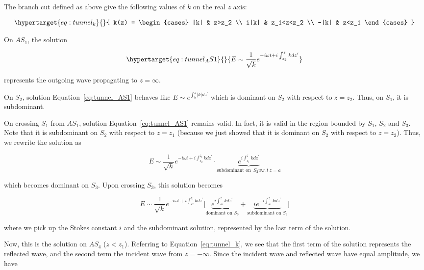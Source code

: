 \documentclass[
  notoc %
]{tufte-book}
\begin{document}
The branch cut defined as above give the following values of \(k\) on
the real \(z\) axis:

\begin{equation}\protect\hypertarget{eq:tunnel_k}{}{
k(z) =
\begin{cases}
|k| & z>z_2 \\
i|k| & z_1<z<z_2 \\
-|k| & z<z_1
\end{cases}
}\label{eq:tunnel_k}\end{equation}

On \(AS_1\), the solution

\begin{equation}\protect\hypertarget{eq:tunnel_AS1}{}{
E\sim \frac{1}{\sqrt{k}}e^{-i\omega t+i \int_{z_2}^z kdz^\prime}
}\label{eq:tunnel_AS1}\end{equation}

represents the outgoing wave propagating to \(z=\infty\).

On \(S_2\), solution Equation~\ref{eq:tunnel_AS1} behaves like
\(E\sim e^{\int_b^z |k|dz^\prime}\) which is dominant on \(S_2\) with
respect to \(z=z_2\). Thus, on \(S_1\), it is subdominant.

On crossing \(S_1\) from \(AS_1\), solution Equation~\ref{eq:tunnel_AS1}
remains valid. In fact, it is valid in the region bounded by \(S_1\),
\(S_2\) and \(S_3\). Note that it is subdominant on \(S_2\) with respect
to \(z=z_1\) (because we just showed that it is dominant on \(S_2\) with
respect to \(z=z_2\)). Thus, we rewrite the solution as

\[
E\sim \frac{1}{\sqrt{k}}e^{-i\omega t + i\int_{z_2}^{z_1} kdz^\prime}\cdot \underbrace{e^{i\int_{z_1}^z kdz^\prime}}_{\text{subdominant on }\ S_2 w.r.t\ z=a}
\]

which becomes dominant on \(S_3\). Upon crossing \(S_3\), this solution
becomes

\[
E\sim \frac{1}{\sqrt{k}}e^{-i\omega t + i\int_{z_2}^{z_1} kdz^\prime} \big[ \underbrace{e^{i\int_{z_1}^z kdz^\prime}}_{\text{dominant on }S_3} + \underbrace{ie^{-i\int_{z_1}^z kdz^\prime}}_{\text{subdominant on }S_3}  \big]
\]

where we pick up the Stokes constant \(i\) and the subdominant solution,
represented by the last term of the solution.

Now, this is the solution on \(AS_4\) (\(z<z_1\)). Referring to
Equation~\ref{eq:tunnel_k}, we see that the first term of the solution
represents the reflected wave, and the second term the incident wave
from \(z=-\infty\). Since the incident wave and reflected wave have
equal amplitude, we have
\end{document}
